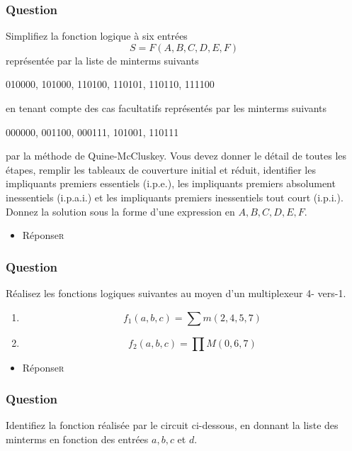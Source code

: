 \documentclass[11pt]{article}
\begin{document}
\subsubsection*{Question}
\label{sec:org80d2162}
Simplifiez la fonction logique à six entrées
  $$
    S = F(A,B,C,D,E,F)
    $$
  représentée par la liste de minterms suivants

010000, 101000, 110100, 110101, 110110, 111100

en tenant compte des cas facultatifs représentés par les minterms
suivants

000000, 001100, 000111, 101001, 110111

par la méthode de Quine-McCluskey. Vous devez donner le détail de
toutes les étapes, remplir les tableaux de couverture initial et
réduit, identifier les impliquants premiers essentiels (i.p.e.), les
impliquants premiers absolument inessentiels (i.p.a.i.) et les
impliquants premiers inessentiels tout court (i.p.i.). Donnez la
solution sous la forme d'une expression en \(A,B,C,D,E,F\).

\begin{itemize}
\item Réponse\hfill{}\textsc{r}
\label{sec:orgee568eb}
\end{itemize}

\subsubsection*{Question}
\label{sec:org6a33dd7}
Réalisez les fonctions logiques suivantes au moyen d'un multiplexeur
  4- vers-1.

\begin{enumerate}
\item $$f_1(a,b,c) = \sum m(2, 4, 5, 7)$$

\item $$f_2(a,b,c) = \prod M(0, 6, 7)$$
\end{enumerate}

\begin{itemize}
\item Réponse\hfill{}\textsc{r}
\label{sec:org3bce22e}
\end{itemize}

\subsubsection*{Question}
\label{sec:org5ec082b}
Identifiez la fonction réalisée par le circuit ci-dessous, en donnant
  la liste des minterms en fonction des entrées \(a, b, c\) et \(d\).
\begin{center}

\end{center}
\end{document}
